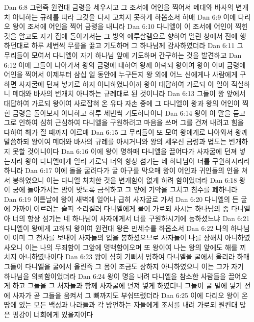 Dan 6:8  그런즉 원컨대 금령을 세우시고 그 조서에 어인을 찍어서 메대와 바사의 변개치 아니하는 규례를 따라 그것을 다시 고치지 못하게 하옵소서 하매
Dan 6:9  이에 다리오 왕이 조서에 어인을 찍어 금령을 내니라
Dan 6:10  다니엘이 이 조서에 어인이 찍힌 것을 알고도 자기 집에 돌아가서는 그 방의 예루살렘으로 향하여 열린 창에서 전에 행하던대로 하루 세번씩 무릎을 꿇고 기도하며 그 하나님께 감사하였더라
Dan 6:11  그 무리들이 모여서 다니엘이 자기 하나님 앞에 기도하며 간구하는 것을 발견하고
Dan 6:12  이에 그들이 나아가서 왕의 금령에 대하여 왕께 아뢰되 왕이여 왕이 이미 금령에 어인을 찍어서 이제부터 삼십 일 동안에 누구든지 왕 외에 어느 신에게나 사람에게 구하면 사자굴에 던져 넣기로 하지 아니하였나이까 왕이 대답하여 가로되 이 일이 적실하니 메대와 바사의 변개치 아니하는 규례대로 된 것이니라
Dan 6:13  그들이 왕 앞에서 대답하여 가로되 왕이여 사로잡혀 온 유다 자손 중에 그 다니엘이 왕과 왕의 어인이 찍힌 금령을 돌아보지 아니하고 하루 세번씩 기도하나이다
Dan 6:14  왕이 이 말을 듣고 그로 인하여 심히 근심하여 다니엘을 구원하려고 마음을 쓰며 그를 건져 내려고 힘을 다하여 해가 질 때까지 이르매
Dan 6:15  그 무리들이 또 모여 왕에게로 나아와서 왕께 말씀하되 왕이여 메대와 바사의 규례를 아시거니와 왕의 세우신 금령과 법도는 변개하지 못할 것이니이다
Dan 6:16  이에 왕이 명하매 다니엘을 끌어다가 사자굴에 던져 넣는지라 왕이 다니엘에게 일러 가로되 너의 항상 섬기는 네 하나님이 너를 구원하시리라 하니라
Dan 6:17  이에 돌을 굴려다가 굴 아구를 막으매 왕이 어인과 귀인들의 인을 쳐서 봉하였으니 이는 다니엘 처치한 것을 변개함이 없게 하려 함이었더라
Dan 6:18  왕이 궁에 돌아가서는 밤이 맞도록 금식하고 그 앞에 기악을 그치고 침수를 폐하니라
Dan 6:19  이튿날에 왕이 새벽에 일어나 급히 사자굴로 가서
Dan 6:20  다니엘의 든 굴에 가까이 이르러는 슬피 소리질러 다니엘에게 물어 가로되 사시는 하나님의 종 다니엘아 너의 항상 섬기는 네 하나님이 사자에게서 너를 구원하시기에 능하셨느냐
Dan 6:21  다니엘이 왕에게 고하되 왕이여 원컨대 왕은 만세수를 하옵소서
Dan 6:22  나의 하나님이 이미 그 천사를 보내어 사자들의 입을 봉하셨으므로 사자들이 나를 상해치 아니하였사오니 이는 나의 무죄함이 그앞에 명백함이오며 또 왕이여 나는 왕의 앞에도 해를 끼치지 아니하였나이다
Dan 6:23  왕이 심히 기뻐서 명하여 다니엘을 굴에서 올리라 하매 그들이 다니엘을 굴에서 올린즉 그 몸이 조금도 상하지 아니하였으니 이는 그가 자기 하나님을 의뢰함이었더라
Dan 6:24  왕이 명을 내려 다니엘을 참소한 사람들을 끌어오게 하고 그들을 그 처자들과 함께 사자굴에 던져 넣게 하였더니 그들이 굴 밑에 닿기 전에 사자가 곧 그들을 움켜서 그 뼈까지도 부숴뜨렸더라
Dan 6:25  이에 다리오 왕이 온 땅에 있는 모든 백성과 나라들과 각 방언하는 자들에게 조서를 내려 가로되 원컨대 많은 평강이 너희에게 있을지어다
